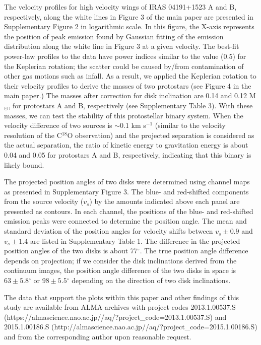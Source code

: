 \documentclass{nature}
\newcommand{\msun}{\mbox{M$_\odot$}}%
\newcommand{\degree}{\mbox{$^\circ$}}
\begin{document}
The velocity profiles for high velocity wings of IRAS 04191+1523 A and B, respectively, along the white lines in Figure 3 
of the main paper are presented in Supplementary Figure 2 in logarithmic scale. 
In this figure, the X-axis represents the position of peak emission found by Gaussian fitting of the emission distribution 
along the white line in Figure 3 at a given velocity. 
The best-fit power-law profiles to the data have power indices similar to the value (0.5) for the Keplerian rotation;
the scatter could be caused by/from contamination of other gas motions such as infall. 
As a result, we applied the Keplerian rotation to their velocity profiles to derive the masses of two protostars 
(see Figure 4 in the main paper.) The masses after correction for disk inclination are 0.14 and 0.12 \msun, 
for protostars A and B, respectively (see Supplementary Table 3). With these masses, we can test the stability of this protostellar binary system\cite{Pineda2015}.
When the velocity difference of two sources is $\sim$0.1 km s$^{-1}$ 
(similar to the velocity resolution of the C$^{18}$O observation) and the projected separation is considered as the actual separation,
the ratio of kinetic energy to gravitation energy is about 0.04 and 0.05 for protostars A and B, respectively, indicating
that this binary is likely bound.

The projected position angles of two disks were determined using channel maps as presented in Supplementary Figure 3.
The blue- and red-shifted components from the source velocity ($v_s$) by the  amounts indicated above each panel are presented as contours.
In each channel, the positions of the blue- and red-shifted emission peaks were connected to determine the position angle.
The mean and standard deviation of the position angles for velocity
shifts between $v_s\pm0.9$ and $v_s\pm1.4$ 
are listed in Supplementary Table 1. 
The difference in the projected position angles of the two disks is about 77$\degree$. 
The true position angle difference depends on
projection; if we consider the disk inclinations derived from the continuum images, the position angle difference 
of the two disks in space is $63\pm5.8\degree$ or $98\pm5.5\degree$ depending on the direction of two disk inclinations.



The data that support the plots within this paper and other findings of
this study are available from ALMA archives with project codes
2013.1.00537.S (https://almascience.nao.ac.jp//aq/?project\_code=2013.1.00537.S)
and 2015.1.00186.S (http://almascience.nao.ac.jp//aq/?project\_code=2015.1.00186.S) and from the corresponding author upon reasonable request.
\end{document}
